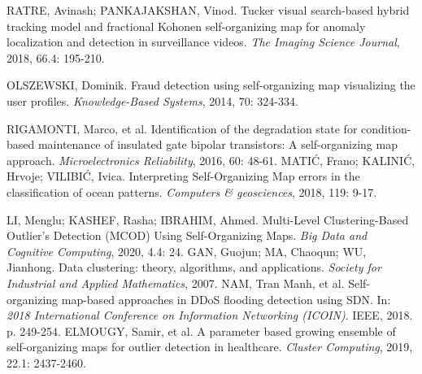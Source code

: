 \documentclass[11pt,twoside,openright]{report}
\begin{document}
\begin{thebibliography}{L}
RATRE, Avinash; PANKAJAKSHAN, Vinod. Tucker visual search-based hybrid tracking model and fractional Kohonen self-organizing map for anomaly localization and detection in surveillance videos. \textit{The Imaging Science Journal}, 2018, 66.4: 195-210.


OLSZEWSKI, Dominik. Fraud detection using self-organizing map visualizing the user profiles. \textit{Knowledge-Based Systems}, 2014, 70: 324-334.

RIGAMONTI, Marco, et al. Identification of the degradation state for condition-based maintenance of insulated gate bipolar transistors: A self-organizing map approach. \textit{Microelectronics Reliability}, 2016, 60: 48-61.
MATIĆ, Frano; KALINIĆ, Hrvoje; VILIBIĆ, Ivica. Interpreting Self-Organizing Map errors in the classification of ocean patterns. \textit{Computers \& geosciences}, 2018, 119: 9-17.

LI, Menglu; KASHEF, Rasha; IBRAHIM, Ahmed. Multi-Level Clustering-Based Outlier’s Detection (MCOD) Using Self-Organizing Maps. \textit{Big Data and Cognitive Computing}, 2020, 4.4: 24.
GAN, Guojun; MA, Chaoqun; WU, Jianhong. Data clustering: theory, algorithms, and applications. \textit{Society for Industrial and Applied Mathematics}, 2007.
NAM, Tran Manh, et al. Self-organizing map-based approaches in DDoS flooding detection using SDN. In: \textit{2018 International Conference on Information Networking (ICOIN)}. IEEE, 2018. p. 249-254.
ELMOUGY, Samir, et al. A parameter based growing ensemble of self-organizing maps for outlier detection in healthcare. \textit{Cluster Computing}, 2019, 22.1: 2437-2460.




\end{thebibliography}
\end{document}
